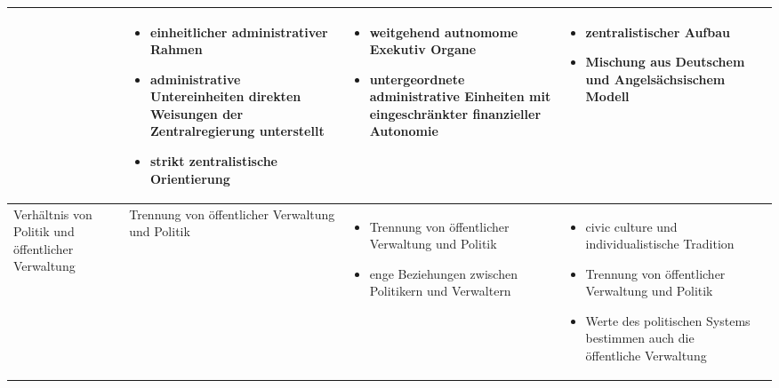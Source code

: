 \begin{landscape}
\begin{scriptsize}
\begin{longtable}[H]{|L{4cm}|L{5cm}|L{5cm}|L{5cm}|L{4cm}|}
&
\begin{itemize}
\item einheitlicher administrativer Rahmen
\item administrative Untereinheiten direkten Weisungen der Zentralregierung unterstellt
\item strikt zentralistische Orientierung
\end{itemize}
&
\begin{itemize}
\item weitgehend autnomome Exekutiv Organe
\item untergeordnete administrative Einheiten mit eingeschränkter finanzieller Autonomie           
\end{itemize}
&
\begin{itemize}
\item zentralistischer Aufbau
\item Mischung aus Deutschem und Angelsächsischem Modell
\end{itemize}\\\hline
Verhältnis von Politik und öffentlicher Verwaltung&	Trennung von öffentlicher Verwaltung und Politik&
\begin{itemize}
\item Trennung von öffentlicher Verwaltung und Politik
\item enge Beziehungen zwischen Politikern und Verwaltern
\end{itemize}
&
 \vspace{-2mm}
\begin{itemize}
\item civic culture und individualistische Tradition
\item Trennung von öffentlicher Verwaltung und Politik
\item Werte des politischen Systems bestimmen auch die öffentliche Verwaltung
 \vspace{-2mm}
 \end{itemize}


\end{longtable}
\end{scriptsize}
\end{landscape}
